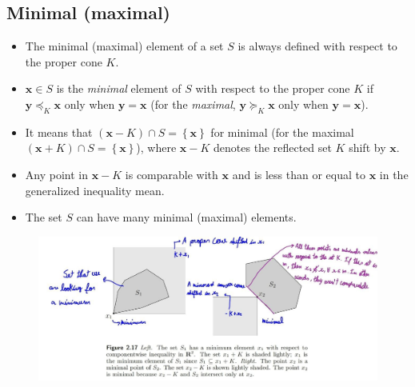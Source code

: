 \documentclass{article}
\begin{document}
\subsection{Minimal (maximal)}
\begin{itemize}
    \item The minimal (maximal) element of a set \(S\) is always defined with respect to the proper cone \(K\).
    \item \(\mathbf{x} \in S\) is the \emph{minimal} element of \(S\) with respect to the proper cone \(K\) if \(\mathbf{y} \preceq_K \mathbf{x}\) only when \(\mathbf{y} = \mathbf{x}\) (for the \emph{maximal}, \(\mathbf{y} \succeq_K \mathbf{x}\) only when \(\mathbf{y} = \mathbf{x}\)).
    \item It means that \((\mathbf{x} - K) \cap S = \left\{ \mathbf{x} \right\}\) for minimal (for the maximal \((\mathbf{x} + K) \cap S = \left\{ \mathbf{x} \right\}\)), where \(\mathbf{x} - K\) denotes the reflected set \(K\) shift by \(\mathbf{x}\).
    \item Any point in \(\mathbf{x} - K\) is comparable with \(\mathbf{x}\) and is less than or equal to \(\mathbf{x}\) in the generalized inequality mean.
    \item The set \(S\) can have many minimal (maximal) elements.
\end{itemize}
\begin{figure}[H]
    \centering
    \includegraphics[scale=.5]{figs/minimum_maximum.jpg}
\end{figure}
\end{document}
